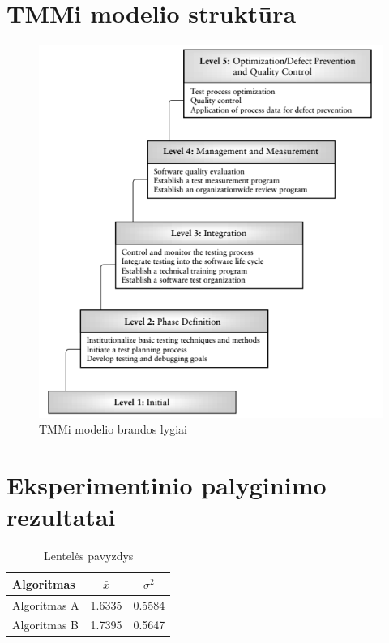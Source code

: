 \documentclass{VUMIFPSkursinis}
\begin{document}
\section{TMMi modelio struktūra}
\begin{figure}[H]
    \centering
    \includegraphics[scale=0.85]{img/TMMI}
    \caption{TMMi modelio brandos lygiai \cite{Burnstein:2010:PST:1965566}}
    \label{img:tmmi}
\end{figure}


\section{Eksperimentinio palyginimo rezultatai}
\begin{table}[H]\footnotesize
  \centering
  \caption{Lentelės pavyzdys}
  {\begin{tabular}{|l|c|c|} \hline
    Algoritmas & $\bar{x}$ & $\sigma^{2}$ \\
    \hline
    Algoritmas A  & 1.6335    & 0.5584       \\
    Algoritmas B  & 1.7395    & 0.5647       \\
    \hline
  \end{tabular}}
  \label{tab:table example}
\end{table}
\end{document}
